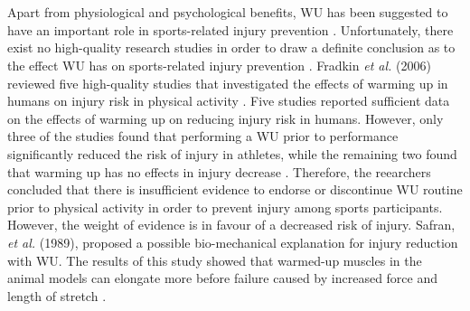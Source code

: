 \\\\Apart from physiological and psychological benefits, WU has been suggested to have an important role in sports-related injury prevention \cite{shellock1985warming}. Unfortunately, there exist no high-quality research studies in order to draw a definite conclusion as to the effect WU has on sports-related injury prevention \cite{fields2007should}. Fradkin \textit{et al.} (2006) reviewed five high-quality studies that investigated the effects of warming up in humans on injury risk in physical activity \cite{fradkin2006does}. Five studies reported sufficient data on the effects of warming up on reducing injury risk in humans. However, only three of the studies found that performing a WU prior to performance significantly reduced the risk of injury in athletes, while the remaining two found that warming up has no effects in injury decrease \cite{fradkin2006does}. Therefore, the reearchers concluded that there is insufficient evidence to endorse or discontinue WU routine prior to physical activity in order to prevent injury among sports participants. However, the weight of evidence is in favour of a decreased risk of injury. Safran, \textit{et al.} (1989), proposed a possible bio-mechanical explanation for injury reduction with WU. The results of this study showed that warmed-up muscles in the animal models can elongate more before failure caused by increased force and length of stretch \cite{safran1989warm}.
